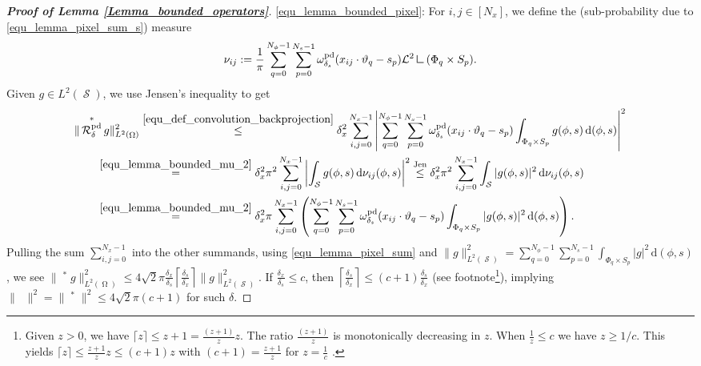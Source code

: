 \documentclass[11pt,reqno]{amsart}
\newcommand{\sumx}{\sum_{i,j=0}^{N_x-1}}
\newcommand{\sums}{\sum_{p=0}^{N_s-1}}
\newcommand{\sumphi}{\sum_{q=0}^{N_\phi-1}}
\newcommand{\mres}{\mathbin{\vrule height 1.6ex depth 0pt width
0.13ex\vrule height 0.13ex depth 0pt width 1.3ex}}
\DeclareMathOperator{\PixelRadon}{\mathcal{R}^\mathrm{pd}_{\delta}}
\DeclareMathOperator{\PixelWeight}{\omega^\mathrm{pd}_{\delta_\mathit{s}}}
\DeclareMathOperator{\imgdom}{\Omega}
\DeclareMathOperator{\sinodom}{\mathcal{S}}
\newcommand{\dd}[1]{\,\mathrm{d}{#1}}
\numberwithin{theorem}{section}
\theoremstyle{remark}
\begin{document}
\begin{proof}[\textbf{Proof of Lemma \ref{Lemma_bounded_operators}}]
\underline{\eqref{equ_lemma_bounded_pixel}}:
For $i,j\in[N_x]$, we define the (sub-probability due to \eqref{equ_lemma_pixel_sum_s}) measure 
\begin{equation}\label{equ_lemma_bounded_mu_2}
\nu_{ij}:= \frac{1}{\pi}\sumphi\sums  \PixelWeight(x_{ij}\cdot \vartheta_q-s_p) \mathcal{L}^2\mres (\Phi_q\times S_p).
\end{equation}
Given $g\in L^2(\sinodom)$, we use Jensen's inequality to get
\begin{align}
 \label{equ_proof_pixel_thm_jensens}
 &  \|\PixelRadon^* g\|_{L^2(\imgdom)}^2 \overset{\eqref{equ_def_convolution_backprojection}}{\leq} \delta_x^2 \sumx  \left| \sumphi\sums  \PixelWeight(x_{ij}\cdot \vartheta_q-s_p) \int_{\Phi_q\times S_p} g(\phi,s) \dd{(\phi,s)} \right| ^2  \notag
    \\
& \qquad \overset{\eqref{equ_lemma_bounded_mu_2}}{=} \delta_x^2 \pi^2 \sumx  \left| \int_{\sinodom} g(\phi,s) \dd{\nu_{ij} (\phi,s)} \right| ^2  
\overset{\text{Jen}}{\leq}
\delta_x^2 \pi^2 \sumx  \int_{\sinodom} |g(\phi,s)|^2 \dd{\nu_{ij}(\phi,s)}\notag
    \\    
&\qquad    \overset{\eqref{equ_lemma_bounded_mu_2}}{=}   \delta_x^2 \pi\sumx \left(\sumphi \sums \PixelWeight(x_{ij}\cdot \vartheta_q -s_p) \int_{\Phi_q\times S_p} |g(\phi,s)|^2 \dd{(\phi,s)}  \right). 
\end{align}
Pulling the sum $\sumx$ into the other summands, using \eqref{equ_lemma_pixel_sum} and $\|g\|^2_{L^2(\sinodom)}=\sumphi\sums \int_{\Phi_q\times S_p} |g|^2 \dd{(\phi,s)}$, we see  $\|\PixelRadon^* g\|_{L^2(\imgdom)}^2\leq 4\sqrt{2} \pi \frac{\delta_x}{\delta_s} \left \lceil \frac{\delta_s}{\delta_x} \right\rceil  \|g\|_{L^2(\sinodom)}^2$. 
If $\frac{\delta_x}{\delta_s}\leq c$, then $\left \lceil \frac{\delta_s}{\delta_x}\right \rceil \leq (c+1) \frac{\delta_s}{\delta_x}$ (see footnote\footnote{Given $z>0$, we have $\lceil z\rceil \leq z+1=  \frac{(z+1)}{z} z$. The ratio $\frac{(z+1)}{z}$ is monotonically decreasing in $z$. When $\frac{1}{z}\leq c$ we have $z\geq 1/c$. This yields $\lceil z \rceil \leq  \frac{z+1}{z} z \leq (c+1) z$ with $(c+1)=\frac{z+1}{z}$ for $z=\frac{1}{c}$ .
}), implying $\|\PixelRadon\|^2 = \|\PixelRadon^*\|^2 \leq  4\sqrt{2}\pi (c+1)$ for such $\delta$.
\end{proof}
\end{document}
